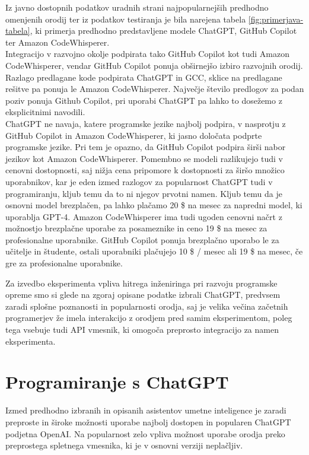 \documentclass[a4paper,12pt,openright]{book}
\begin{document}
Iz javno dostopnih podatkov uradnih strani najpopularnejših predhodno omenjenih orodij \cite{github_copilot_chat, openai_chatgpt, saasworthy_codewhisperer} ter iz podatkov testiranja je bila narejena tabela \ref{fig:primerjava-tabela}, ki primerja predhodno predstavljene modele ChatGPT, GitHub Copilot ter Amazon CodeWhisperer.  \\
Integracijo v razvojno okolje podpirata tako GitHub Copilot kot tudi Amazon CodeWhisperer, vendar GitHub Copilot ponuja obširnejšo izbiro razvojnih orodij. Razlago predlagane kode podpirata ChatGPT in GCC, sklice na predlagane rešitve pa ponuja le Amazon CodeWhisperer. Največje število predlogov za podan poziv ponuja Github Copilot, pri uporabi ChatGPT pa lahko to dosežemo z eksplicitnimi navodili.\\
ChatGPT ne navaja, katere programske jezike najbolj podpira, v nasprotju z GitHub Copilot in Amazon CodeWhisperer, ki jasno določata podprte programske jezike. Pri tem je opazno, da GitHub Copilot podpira širši nabor jezikov kot Amazon CodeWhisperer. Pomembno se modeli razlikujejo tudi v cenovni dostopnosti, saj nižja cena pripomore k dostopnosti za širšo množico uporabnikov, kar je eden izmed razlogov za popularnost ChatGPT tudi v programiranju, kljub temu da to ni njegov prvotni namen. Kljub temu da je osnovni model brezplačen, pa lahko plačamo 20 \$ na mesec za napredni model, ki uporablja GPT-4. Amazon CodeWhisperer ima tudi ugoden cenovni načrt z možnostjo brezplačne uporabe za posameznike in ceno 19 \$ na mesec za profesionalne uporabnike. GitHub Copilot ponuja brezplačno uporabo le za učitelje in študente, ostali uporabniki plačujejo 10 \$ / mesec ali 19 \$ na mesec, če gre za profesionalne uporabnike.
\cite{github_copilot_chat, openai_chatgpt, saasworthy_codewhisperer}

Za izvedbo eksperimenta vpliva hitrega inženiringa pri razvoju programske opreme smo si glede na zgoraj opisane podatke izbrali ChatGPT, predvsem zaradi splošne poznanosti in popularnosti orodja, saj je velika večina začetnih programerjev že imela interakcijo z orodjem pred samim eksperimentom, poleg tega vsebuje tudi API vmesnik, ki omogoča preprosto integracijo za namen eksperimenta.

\section{Programiranje s ChatGPT}
Izmed predhodno izbranih in opisanih asistentov umetne inteligence je zaradi preproste in široke možnosti uporabe najbolj dostopen in popularen ChatGPT podjetna OpenAI. Na popularnost zelo vpliva možnost uporabe orodja preko preprostega spletnega vmesnika, ki je v osnovni verziji neplačljiv.
\end{document}
